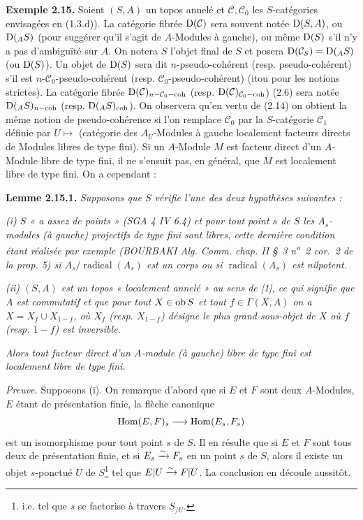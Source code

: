 \documentclass[11pt]{article}
\begin{document}
\textbf{Exemple 2.15.} Soient \((S,A)\) un topos annelé et \(\mathcal C,\mathcal C_0\) les \(S\)-catégories envisagées en (1.3.d)). La catégorie fibrée \(\mathrm D(\mathcal C)\) sera souvent notée \(\mathrm D(S,A)\), ou \(\mathrm D({}_A S)\) (pour
suggérer qu'il s'agit de \(A\)-Modules à gauche), ou même \(\mathrm D(S)\) s'il n'y a pas d'ambiguïté sur \(A\). On notera \(S\) l'objet final de \(S\) et posera \(\mathrm D(\mathcal C_S)=\mathrm D({}_A S)\) (ou \(\mathrm D(S)\)). Un objet de \(\mathrm D(S)\) sera dit \(n\)-pseudo-cohérent (resp. pseudo-cohérent) s'il est \(n\)-\(\mathcal C_0\)-pseudo-cohérent (resp. \(\mathcal C_0\)-pseudo-cohérent) (itou pour les notions strictes). La catégorie fibrée \(\mathrm D(\mathcal C)_{n-\mathcal C_0-\operatorname{coh}}\) (resp. \(\mathrm D(\mathcal C)_{\mathcal C_0-\operatorname{coh}}\)) (2.6) sera notée \(\mathrm D({}_A S)_{n-\operatorname{coh}}\) (resp. \(\mathrm D({}_A S)_{\operatorname{coh}}\)). On observera qu'en vertu de (2.14) on obtient la même notion de pseudo-cohérence si l'on remplace \(\mathcal C_0\) par la \(S\)-catégorie \(\mathcal C_1\) définie par \(U\longmapsto\) (catégorie des \(A_U\)-Modules à gauche localement facteurs directs de Modules libres de type fini). Si un \(A\)-Module \(M\) est facteur direct d'un \(A\)-Module libre de type fini, il ne s'ensuit pas, en général, que \(M\) est localement libre de type fini. On a cependant :

\textbf{Lemme 2.15.1.} \emph{Supposons que \(S\) vérifie l'une des deux hypothèses suivantes :}

\emph{(i) \(S\) « a assez de points » (SGA 4 IV 6.4) et pour tout point \(s\) de \(S\) les \(A_s\)-modules (à gauche) projectifs de type fini sont libres, cette dernière condition étant réalisée par exemple (BOURBAKI Alg. Comm. chap. II \S~3 n\textsuperscript{o}~2 cor.~2 de la prop. 5) si \(A_s/\operatorname{radical}(A_s)\) est un corps ou si \(\operatorname{radical}(A_s)\) est nilpotent.}

\emph{(ii) \((S,A)\) est un topos « localement annelé » au sens de [1], ce qui signifie que \(A\) est commutatif et que pour tout \(X\in\operatorname{ob} S\) et tout \(f\in\Gamma(X,A)\) on a \(X=X_f\cup X_{1-f}\), où \(X_f\) (resp. \(X_{1-f}\)) désigne le plus grand sous-objet de \(X\) où \(f\) (resp. \(1-f\)) est inversible.}

\emph{Alors tout facteur direct d'un \(A\)-module (à gauche) libre de type fini est localement libre de type fini.}

\emph{Preuve.} Supposons (i). On remarque d'abord que si \(E\) et \(F\) sont deux \(A\)-Modules, \(E\) étant de présentation finie, la flèche canonique
\[
  \operatorname{Hom}(E,F)_s\longrightarrow\operatorname{Hom}(E_s,F_s)
\]
est un
isomorphisme pour tout point \(s\) de \(S\). Il en résulte que si \(E\) et \(F\) sont tous deux de présentation finie, et si \(E_s\xrightarrow{\sim} F_s\) en un point \(s\) de \(S\), alors il existe un objet \(s\)-ponctué \(U\) de \(S\)\footnote{i.e. tel que \(s\) se factorise à travers \(S_{/U}\).} tel que \(E|U\xrightarrow{\sim} F|U\). La conclusion en découle aussitôt.
\end{document}

